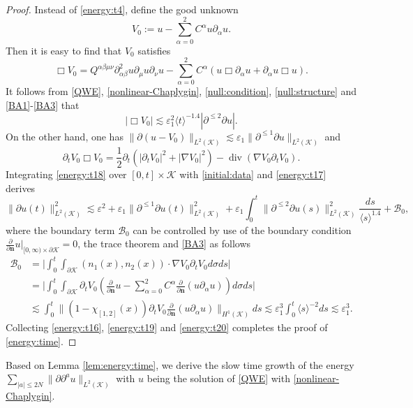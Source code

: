 \documentclass[11pt,twoside]{article}
\def\cB{\mathcal B}
\def\cK{\mathcal K}
\def\ds{\displaystyle}
\def\p{\partial}
\def\ve{\varepsilon}
\def\dive{\operatorname{div}}
\def\ls{\lesssim}
\def\bn{\mathbf{n}}
\newcommand{\w}[1]{\langle {#1} \rangle}
\theoremstyle{plain}
\theoremstyle{definition}
\numberwithin{equation}{section}
\begin{document}
\begin{proof}
Instead of \eqref{energy:t4}, define the good unknown
\begin{equation*}
\ds V_0:=u-\sum_{\alpha=0}^2C^{\alpha}u\p_{\alpha}u.
\end{equation*}
Then it is easy to find that $V_0$ satisfies
\begin{equation*}
\Box V_0=Q^{\alpha\beta\mu\nu}\p^2_{\alpha\beta}u\p_{\mu}u\p_{\nu}u-\sum_{\alpha=0}^2C^{\alpha}(u\Box\p_{\alpha}u+\p_{\alpha}u\Box u).
\end{equation*}
It follows from \eqref{QWE}, \eqref{nonlinear-Chaplygin}, \eqref{null:condition}, \eqref{null:structure} and \eqref{BA1}-\eqref{BA3} that
\begin{equation}\label{energy:t17}
|\Box V_0|\ls\ve_1^2\w{t}^{-1.4}|\p^{\le2}\p u|.
\end{equation}
On the other hand, one has $\|\p(u-V_0)\|_{L^2(\cK)}\ls\ve_1\|\p^{\le1}\p u\|_{L^2(\cK)}$ and
\begin{equation}\label{energy:t18}
\p_tV_0\Box V_0=\frac12\p_t(|\p_tV_0|^2+|\nabla V_0|^2)-\dive(\nabla V_0\p_tV_0).
\end{equation}
Integrating \eqref{energy:t18} over $[0,t]\times\cK$ with \eqref{initial:data} and \eqref{energy:t17} derives
\begin{equation}\label{energy:t19}
\|\p u(t)\|^2_{L^2(\cK)}\ls\ve^2+\ve_1\|\p^{\le1}\p u(t)\|^2_{L^2(\cK)}+\ve_1\int_0^t\|\p^{\le2}\p u(s)\|^2_{L^2(\cK)}\frac{ds}{\w{s}^{1.4}}+\cB_0,
\end{equation}
where the boundary term $\cB_0$ can be controlled by use of the boundary condition $\frac{\p}{\p\bn}u|_{[0,\infty)\times\p\cK}=0$, the trace
theorem and \eqref{BA3} as follows
\begin{equation}\label{energy:t20}
\begin{split}
\cB_0&=\Big|\int_0^t\int_{\p\cK}(n_1(x),n_2(x))\cdot\nabla V_0\p_tV_0d\sigma ds\Big|\\
&=\Big|\int_0^t\int_{\p\cK}\p_tV_0(\frac{\p}{\p\bn}u-\sum_{\alpha=0}^2C^{\alpha}\frac{\p}{\p\bn}(u\p_{\alpha}u))d\sigma ds\Big|\\
&\ls\int_0^t\|(1-\chi_{[1,2]}(x))\p_tV_0\frac{\p}{\p\bn}(u\p_{\alpha}u)\|_{H^1(\cK)}ds\ls\ve_1^3\int_0^t\w{s}^{-2}ds\ls\ve_1^3.
\end{split}
\end{equation}
Collecting \eqref{energy:t16}, \eqref{energy:t19} and \eqref{energy:t20} completes the proof of \eqref{energy:time}.
\end{proof}

Based on Lemma \ref{lem:energy:time}, we derive the slow time growth of the energy $\ds\sum_{|a|\le2N}\|\p\p^au\|_{L^2(\cK)}$
with $u$ being the solution of \eqref{QWE} with \eqref{nonlinear-Chaplygin}.
\end{document}
